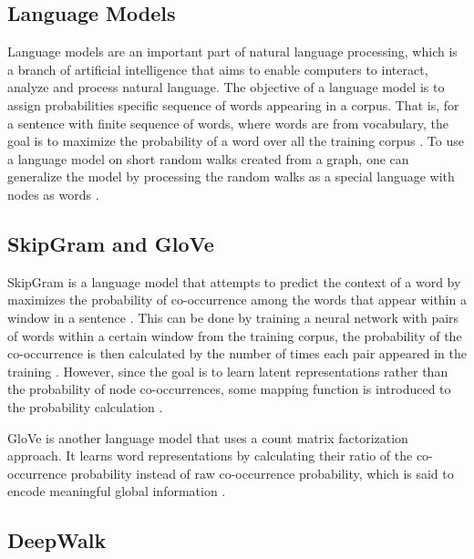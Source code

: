 \subsection{Language Models}

Language models are an important part of natural language processing, which is a branch of artificial intelligence that aims to enable computers to interact, analyze and process natural language.
The objective of a language model is to assign probabilities specific sequence of words appearing in a corpus.
That is, for a sentence with finite sequence of words, where words are from vocabulary, the goal is to maximize the probability of a word over all the training corpus \cite{perozzi_deepwalk:_2014}.
To use a language model on short random walks created from a graph, one can generalize the model by processing the random walks as a special language with nodes as words \cite{perozzi_deepwalk:_2014}.

\subsection{SkipGram and GloVe}

SkipGram is a language model that attempts to predict the context of a word by maximizes the probability of co-occurrence among the words that appear within a window in a sentence \cite{perozzi_deepwalk:_2014}.
This can be done by training a neural network with pairs of words within a certain window from the training corpus, the probability of the co-occurrence is then calculated by the number of times each pair appeared in the training \cite{mccormick_word2vec_nodate}.
However, since the goal is to learn latent representations rather than the probability of node co-occurrences, some mapping function is introduced to the probability calculation \cite{perozzi_deepwalk:_2014}.

\ac{GloVe} is another language model that uses a count matrix factorization approach.
It learns word representations by calculating their ratio of the co-occurrence probability instead of raw co-occurrence probability, which is said to encode meaningful global information \cite{pennington_glove:_2014}.

\subsection{DeepWalk}

